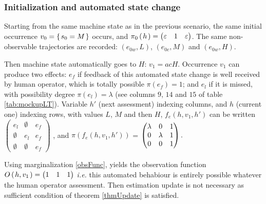 \subsubsection{Initialization and automated state change}
Starting from the same machine state as in the previous scenario, 
the same initial occurrence $v_0 = \left\{ \left.  s_0 = M  \right. \right\}$ occurs, 
and $\pi_0 \left( \left. h \right. \right) = \begin{pmatrix} \varepsilon & 1 & \varepsilon  \end{pmatrix}$.
The same non-observable trajectories are recorded: 
$(e_{0w},L)$, $(e_{0c},M)$ and $(e_{0w},H)$.

Then machine state automatically goes to $H$: $v_1 = acH$.
Occurrence $v_1$ can produce two effects: 
$e_f$ if feedback of this automated state change is
well received by human operator, which is totally possible 
$\pi(e_f)=1$; and $e_l$ if it is missed, with possibility degree $\pi(e_l)=\lambda$
(see columns $9$, $14$ and $15$ of table \ref{tab:mockupLT}). 
Variable $h'$ (next assessment) indexing columns, 
and $h$ (current one) indexing rows, with values $L$, $M$ and then $H$,
$f_e(h,v_1,h')$ can be written \tiny 
$\begin{pmatrix} e_l & \emptyset & e_f \\ \emptyset & e_l & e_f \\ \emptyset & \emptyset & e_f  \end{pmatrix}$ \normalsize,
and $\pi(f_e(h,v_1,h'))$ = \tiny 
$\begin{pmatrix} \lambda & 0 & 1 \\ 0 & \lambda & 1 \\ 0 & 0 & 1  \end{pmatrix} \mbox{\normalsize.}$\normalsize 

Using marginalization \ref{obsFunc}, yields the observation function
$O \left( \left.  h, v_1 \right. \right) = \begin{pmatrix} 1 & 1 & 1 \end{pmatrix}$ 
\textit{i.e.} this automated behabiour is entirely possible
whatever the human operator assessment.
Then estimation update is not necessary 
as sufficient condition of theorem \ref{thmUpdate}
is satisfied.

